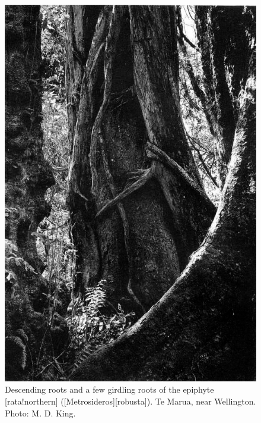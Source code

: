 \begin{figure}[!b]
	\begin{minipage}[t]{\textwidth}
		\begin{minipage}[t]{(\textwidth-\fgap) * \real{0.54}}
			\centering
			\includegraphics[width=\textwidth]{graphics/figure50rata.jpg}
			\caption[Descending roots and a few girdling roots of the epiphyte northern rata]{Descending roots and a few girdling roots of the epiphyte [rata!northern] ([Metrosideros][robusta]).
			Te Marua, near Wellington.
			Photo: M. D. King.}%
			\label{fig:50rata}
		\end{minipage}\hspace{\fgap}%

\end{minipage}
\end{figure}
